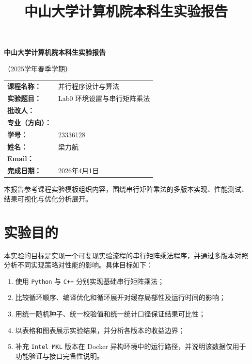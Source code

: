 \documentclass[UTF8,a4paper,12pt]{ctexart}
\title{\heiti 中山大学计算机院本科生实验报告}
\author{}
\date{}
\begin{document}
\begin{titlepage}
  \centering
  {\bfseries 中山大学计算机院本科生实验报告\par}
  \vspace{0.5em}
  {（2025学年春季学期）\par}
  \vspace{2em}

  \begin{tabularx}{0.9\textwidth}{>{\bfseries}p{4cm}X}
    课程名称： & 并行程序设计与算法 \\
    实验题目： & Lab0 环境设置与串行矩阵乘法 \\
    批改人： & \\
    专业（方向）： & \\
    学号： & 23336128 \\
    姓名： & 梁力航 \\
    Email： & \\
    完成日期： & 2026年4月1日 \\
  \end{tabularx}

  \vfill
  \begin{minipage}{0.88\textwidth}
    \small
    本报告参考课程实验模板组织内容，围绕串行矩阵乘法的多版本实现、性能测试、结果可视化与优化分析展开。
  \end{minipage}
\end{titlepage}

\section{实验目的}

本实验的目标是实现一个可复现实验流程的串行矩阵乘法程序，并通过多版本对照分析不同实现策略对性能的影响。具体目标如下：

\begin{enumerate}[leftmargin=2.2em]
  \item 使用 \texttt{Python} 与 \texttt{C++} 分别实现基础串行矩阵乘法；
  \item 比较循环顺序、编译优化和循环展开对缓存局部性及运行时间的影响；
  \item 用统一随机种子、统一校验值和统一统计口径保证结果可比性；
  \item 以表格和图表展示实验结果，并分析各版本的收益边界；
  \item 补充 \texttt{Intel MKL} 版本在 Docker 异构环境中的运行路径，并说明该数据仅用于功能验证与接口完备性说明。
\end{enumerate}
\end{document}
